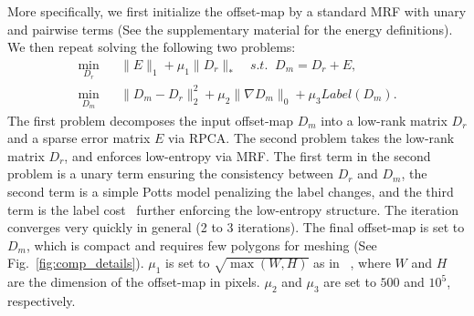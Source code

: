 
%
%

More specifically, we first initialize the offset-map by a standard MRF
with unary and pairwise terms (See the supplementary material for the
energy definitions). We then repeat solving the following two problems:
\begin{eqnarray}
 \min_{D_r}&& \|E\|_1 + \mu_1 \|D_r\|_*\quad s.t.\;\; D_m
 = D_r + E, \nonumber \\
 \min_{D_m}&& \|D_m-D_r\|^2_2 + \mu_2\|\nabla D_m\|_0 + \mu_3Label(D_m) \label{eq:sub2}.
\end{eqnarray}
The first problem decomposes the input offset-map $D_m$ into a low-rank
matrix $D_r$ and a sparse error matrix $E$ via RPCA. The second problem
takes the low-rank matrix $D_r$, and enforces low-entropy via MRF. The
first term in the second problem is a unary term ensuring the
consistency between $D_r$ and $D_m$, the second term is a simple Potts
model penalizing the label changes, and the third term is the label
cost~\cite{Delong2012} further enforcing the low-entropy structure.
%
The iteration converges very quickly in general (2 to 3 iterations). The
final offset-map is set to $D_m$, which is compact and requires few
polygons for meshing (See Fig.~\ref{fig:comp_details}).
$\mu_1$ is set to $\sqrt{\max(W, H)}$ as in ~\cite{Candes2011}, where
$W$ and $H$ are the dimension of the offset-map in pixels. $\mu_2$ and
$\mu_3$ are set to $500$ and $10^5$, respectively.



